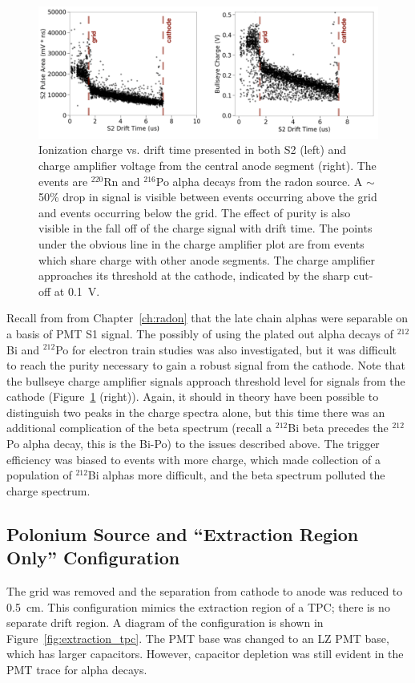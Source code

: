 \begin{figure}[htbp]
\begin{center}
\includegraphics[width=\textwidth]{figures/etrains/s2_charge_vs_drift.png}
\caption{Ionization charge vs. drift time presented in both S2 (left) and charge amplifier voltage from the central anode segment (right). The events are $^{220}$Rn and $^{216}$Po alpha decays from the radon source. A $\sim$50\% drop in signal is visible between events occurring above the grid and events occurring below the grid. The effect of purity is also visible in the fall off of the charge signal with drift time. The points under the obvious line in the charge amplifier plot are from events which share charge with other anode segments. The charge amplifier approaches its threshold at the cathode, indicated by the sharp cut-off at 0.1~V.}
\label{fig:charge_vs_drift}
\end{center}
\end{figure}

Recall from from Chapter~\ref{ch:radon} that the late chain alphas were separable on a basis of \ac{PMT} S1 signal. The possibly of using the plated out alpha decays of $^{212}$Bi and $^{212}$Po for electron train studies was also investigated, but it was difficult to reach the purity necessary to gain a robust signal from the cathode. Note that the bullseye charge amplifier signals approach threshold level for signals from the cathode (Figure~\ref{fig:charge_vs_drift} (right)). Again, it should in theory have been possible to distinguish two peaks in the charge spectra alone, but this time there was an additional complication of the beta spectrum (recall a $^{212}$Bi beta precedes the $^{212}$Po alpha decay, this is the Bi-Po) to the issues described above. The trigger efficiency was biased to events with more charge, which made collection of a population of $^{212}$Bi alphas more difficult, and the beta spectrum polluted the charge spectrum. 


\subsection{Polonium Source and ``Extraction Region Only'' Configuration}
The grid was removed and the separation from cathode to anode was reduced to 0.5~cm. This configuration mimics the extraction region of a \ac{TPC}; there is no separate drift region. A diagram of the configuration is shown in Figure~\ref{fig:extraction_tpc}. The \ac{PMT} base was changed to an \ac{LZ} \ac{PMT} base, which has larger capacitors. However, capacitor depletion was still evident in the \ac{PMT} trace for alpha decays.  

